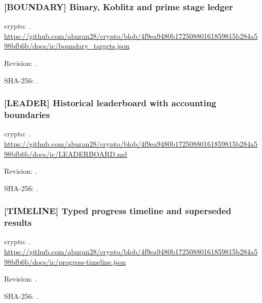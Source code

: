 \par\noindent\begin{minipage}{\linewidth}\small
\subsubsection*{[BOUNDARY] Binary, Koblitz and prime stage ledger}\label{art:BOUNDARY}
crypto: .
\url{https://github.com/aburan28/crypto/blob/4f9ea9480b17250880161859815b284a598bfb6b/docs/ic/boundary_targets.json}
\par Revision: .
\par SHA-256: .
\end{minipage}\par\medskip

\par\noindent\begin{minipage}{\linewidth}\small
\subsubsection*{[LEADER] Historical leaderboard with accounting boundaries}\label{art:LEADER}
crypto: .
\url{https://github.com/aburan28/crypto/blob/4f9ea9480b17250880161859815b284a598bfb6b/docs/ic/LEADERBOARD.md}
\par Revision: .
\par SHA-256: .
\end{minipage}\par\medskip

\par\noindent\begin{minipage}{\linewidth}\small
\subsubsection*{[TIMELINE] Typed progress timeline and superseded results}\label{art:TIMELINE}
crypto: .
\url{https://github.com/aburan28/crypto/blob/4f9ea9480b17250880161859815b284a598bfb6b/docs/ic/progress-timeline.json}
\par Revision: .
\par SHA-256: .
\end{minipage}\par\medskip

